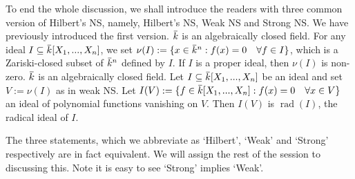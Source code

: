 \documentclass[12pt]{article}
\theoremstyle{definition}
\theoremstyle{plain}
\DeclareMathOperator{\rad}{rad}
\newcommand{\overbar}[1]{\mkern 1.5mu\overline{\mkern-1.5mu#1\mkern-1.5mu}\mkern 1.5mu}
\renewcommand{\bar}{\overbar}
\begin{document}
To end the whole discussion, we shall introduce the readers with three common version of Hilbert's NS, namely, Hilbert's NS, Weak NS and Strong NS. We have previously introduced the first version.
 $\bar{k}$ is an algebraically closed field. For any ideal $I\subseteq \bar{k}[X_1, ..., X_n]$, we set $\nu(I):=\{x\in \bar{k}^n: f(x)=0 \quad\forall f\in I\}$, which is a Zariski-closed subset of $\bar{k}^n$ defined by $I$. If $I$ is a proper ideal, then $\nu(I)$ is non-zero.
 $\bar{k}$ is an algebraically closed field. Let $I\subseteq \bar{k}[X_1, ..., X_n]$ be an ideal and set $V:=\nu(I)$ as in weak NS. Let $I(V):=\{f\in \bar{k}[X_1, ..., X_n]: f(x)=0\quad \forall x\in V\}$ an ideal of polynomial functions vanishing on $V$. Then $I(V)$ is $\rad(I)$, the radical ideal of $I$.

\medskip
The three statements, which we abbreviate as `Hilbert', `Weak' and `Strong' respectively are in fact equivalent. We will assign the rest of the session to discussing this. Note it is easy to see `Strong' implies `Weak'.
\end{document}
